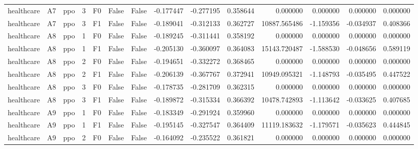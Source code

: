 \begin{tabular}{lllrlllrrrrrrr}
healthcare &      A7 &       ppo &     3 &  F0 &           False &            False & -0.177447 & -0.277195 & 0.358644 &         0.000000 &           0.000000 &        0.000000 &            0.000000 \\
healthcare &      A7 &       ppo &     3 &  F1 &           False &            False & -0.189041 & -0.312133 & 0.362727 &     10887.565486 &          -1.159356 &       -0.034937 &            0.408366 \\
healthcare &      A8 &       ppo &     1 &  F0 &           False &            False & -0.189245 & -0.311441 & 0.358192 &         0.000000 &           0.000000 &        0.000000 &            0.000000 \\
healthcare &      A8 &       ppo &     1 &  F1 &           False &            False & -0.205130 & -0.360097 & 0.364083 &     15143.720487 &          -1.588530 &       -0.048656 &            0.589119 \\
healthcare &      A8 &       ppo &     2 &  F0 &           False &            False & -0.194651 & -0.332272 & 0.368465 &         0.000000 &           0.000000 &        0.000000 &            0.000000 \\
healthcare &      A8 &       ppo &     2 &  F1 &           False &            False & -0.206139 & -0.367767 & 0.372941 &     10949.095321 &          -1.148793 &       -0.035495 &            0.447522 \\
healthcare &      A8 &       ppo &     3 &  F0 &           False &            False & -0.178735 & -0.281709 & 0.362315 &         0.000000 &           0.000000 &        0.000000 &            0.000000 \\
healthcare &      A8 &       ppo &     3 &  F1 &           False &            False & -0.189872 & -0.315334 & 0.366392 &     10478.742893 &          -1.113642 &       -0.033625 &            0.407685 \\
healthcare &      A9 &       ppo &     1 &  F0 &           False &            False & -0.183349 & -0.291924 & 0.359960 &         0.000000 &           0.000000 &        0.000000 &            0.000000 \\
healthcare &      A9 &       ppo &     1 &  F1 &           False &            False & -0.195145 & -0.327547 & 0.364409 &     11119.183632 &          -1.179571 &       -0.035623 &            0.444845 \\
healthcare &      A9 &       ppo &     2 &  F0 &           False &            False & -0.164092 & -0.235522 & 0.361821 &         0.000000 &           0.000000 &        0.000000 &            0.000000 \\

\end{tabular}
